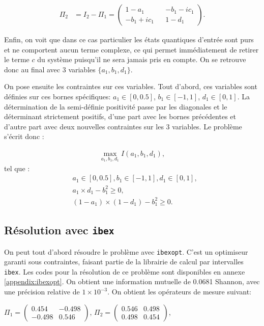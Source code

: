 \begin{align}
    \Pi_2 &= I_2 - \Pi_1 = \begin{pmatrix}1 - a_1 && -b_1 - ic_1 \\ -b_1 + ic_1 && 1 - d_1\end{pmatrix}.
\end{align}

Enfin, on voit que dans ce cas particulier les états quantiques d'entrée sont purs et ne comportent aucun terme complexe, ce qui permet immédiatement de retirer le terme $c$ du système puisqu'il ne sera jamais pris en compte. On se retrouve donc au final avec 3 variables $\{a_1, b_1, d_1\}$.

On pose ensuite les contraintes sur ces variables. Tout d'abord, ces variables sont définies sur ces bornes spécifiques: $a_1 \in [0, 0.5]$, $b_1 \in [-1, 1]$, $d_1 \in [0, 1]$. La détermination de la semi-définie positivité passe par les diagonales et le déterminant strictement positifs, d'une part avec les bornes précédentes et d'autre part avec deux nouvelles contraintes sur les 3 variables.
Le problème s'écrit donc :

\begin{align}
    \max\limits_{a_1, b_1, d_1} I(a_1, b_1, d_1) , \nonumber
\end{align}
tel que :
\begin{align}
    &a_1 \in [0, 0.5] , b_1 \in [-1, 1] , d_1 \in [0, 1] , \nonumber \\
    &a_1 \times d_1 - b_1^2 \geq 0 , \nonumber \\
    &(1-a_1) \times (1-d_1) - b_1^2 \geq 0. \nonumber
\end{align}

\subsection{Résolution avec \texttt{ibex}}
On peut tout d'abord résoudre le problème avec \texttt{ibexopt}. C'est un optimiseur garanti sous contraintes, faisant partie de la librairie de calcul par intervalles \texttt{ibex}. Les codes pour la résolution de ce problème sont disponibles en annexe \ref{appendix:ibexopt}. On obtient une information mutuelle de 0.0681 Shannon, avec une précision relative de $1\times10^{-3}$. On obtient les opérateurs de mesure suivant:

$\Pi_1 = \begin{pmatrix} 0.454 & -0.498 \\ -0.498 & 0.546 \end{pmatrix}$, \quad $\Pi_2 = \begin{pmatrix}0.546 & 0.498 \\ 0.498 & 0.454 \end{pmatrix}$,


